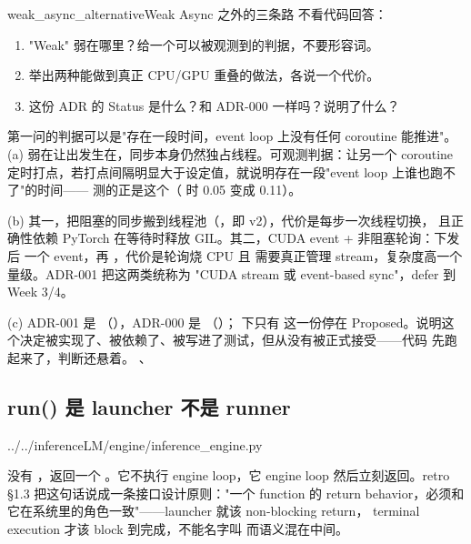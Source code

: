 \begin{checkpoint}{weak_async_alternative}{Weak Async 之外的三条路}
不看代码回答：
\begin{enumerate}[label=(\alph*)]
  \item "Weak" 弱在哪里？给一个可以被观测到的判据，不要形容词。
  \item 举出两种能做到真正 CPU/GPU 重叠的做法，各说一个代价。
  \item 这份 ADR 的 Status 是什么？和 ADR-000 一样吗？说明了什么？
\end{enumerate}
\hint 第一问的判据可以是"存在一段时间，event loop 上没有任何 coroutine 能推进"。
\ifshowanswers
\tcblower
\answer (a) 弱在让出发生在，同步本身仍然独占线程。可观测判据：让另一个
coroutine 定时打点，若打点间隔明显大于设定值，就说明存在一段"event loop 上谁也跑不了"的时间——
 测的正是这个（ 时 0.05 变成 0.11）。

(b) 其一，把阻塞的同步搬到线程池（，即 v2），代价是每步一次线程切换，
且正确性依赖 PyTorch 在等待时释放 GIL。其二，CUDA event + 非阻塞轮询：下发后 
一个 event，再 ，代价是轮询烧 CPU 且
需要真正管理 stream，复杂度高一个量级。ADR-001 把这两类统称为 "CUDA stream 或 event-based
sync"，defer 到 Week 3/4。

(c) ADR-001 是 （），ADR-000 是
（）； 下只有
这一份停在 Proposed。说明这个决定被实现了、被依赖了、被写进了测试，但从没有被正式接受——代码
先跑起来了，判断还悬着。
\whereincode {}、
\fi
\end{checkpoint}

\subsection{run() 是 launcher 不是 runner}
\label{sec:a-loop-run}

%
  {../../inferenceLM/engine/inference_engine.py}

 没有 ，返回一个 。它不执行 engine loop，它
 engine loop 然后立刻返回。retro §1.3 把这句话说成一条接口设计原则："一个
function 的 return behavior，必须和它在系统里的角色一致"——launcher 就该 non-blocking return，
terminal execution 才该 block 到完成，不能名字叫  而语义混在中间。

